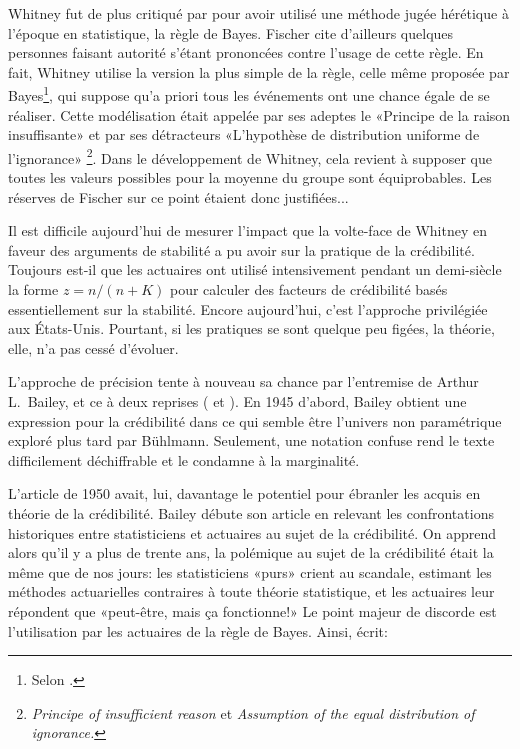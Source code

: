 Whitney fut de plus critiqué par \cite{Fisher:Whitney:discussion:1919}
pour avoir utilisé une méthode jugée hérétique à l'époque en
statistique, la règle de Bayes. Fischer cite d'ailleurs quelques
personnes faisant autorité s'étant prononcées contre l'usage de cette
règle. En fait, Whitney utilise la version la plus simple de la règle,
celle même proposée par Bayes\footnote{%
  Selon \cite{Bailey:1950}.}, %
qui suppose qu'a priori tous les événements ont une chance égale de se
réaliser. Cette modélisation était appelée par ses adeptes le
«Principe de la raison insuffisante» et par ses détracteurs
«L'hypothèse de distribution uniforme de l'ignorance»%
\footnote{\emph{Principe of insufficient reason} et \emph{Assumption
    of the equal distribution of ignorance.}}. %
Dans le développement de Whitney, cela revient à supposer que toutes
les valeurs possibles pour la moyenne du groupe sont équiprobables.
Les réserves de Fischer sur ce point étaient donc justifiées...

Il est difficile aujourd'hui de mesurer l'impact que la volte-face de
Whitney en faveur des arguments de stabilité a pu avoir sur la
pratique de la crédibilité. Toujours est-il que les actuaires ont
utilisé intensivement pendant un demi-siècle la forme $z=n/(n+K)$ pour
calculer des facteurs de crédibilité basés essentiellement sur la
stabilité. Encore aujourd'hui, c'est l'approche privilégiée aux
États-Unis. Pourtant, si les pratiques se sont quelque peu figées, la
théorie, elle, n'a pas cessé d'évoluer.

L'approche de précision tente à nouveau sa chance par l'entremise de
Arthur L.\ Bailey, et ce à deux reprises (\cite{Bailey:1945} et
\cite{Bailey:1950}). En 1945 d'abord, Bailey obtient une expression pour
la crédibilité dans ce qui semble être l'univers non paramétrique
exploré plus tard par Bühlmann. Seulement, une notation confuse rend
le texte difficilement déchiffrable et le condamne à la marginalité.

L'article de 1950 avait, lui, davantage le potentiel pour ébranler les
acquis en théorie de la crédibilité. Bailey débute son article en
relevant les confrontations historiques entre statisticiens et
actuaires au sujet de la crédibilité. On apprend alors qu'il y a plus
de trente ans, la polémique au sujet de la crédibilité était la même
que de nos jours: les statisticiens «purs» crient au scandale,
estimant les méthodes actuarielles contraires à toute théorie
statistique, et les actuaires leur répondent que «peut-être, mais ça
fonctionne!» Le point majeur de discorde est l'utilisation par les
actuaires de la règle de Bayes. Ainsi, \cite{Bailey:1950} écrit:

